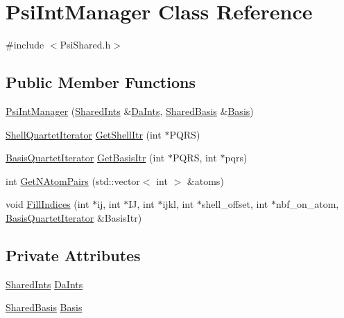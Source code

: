 \hypertarget{classJKBuilder_1_1PsiIntManager}{
\section{PsiIntManager Class Reference}
\label{classJKBuilder_1_1PsiIntManager}
}


{\ttfamily \#include $<$PsiShared.h$>$}\subsection*{Public Member Functions}
\begin{DoxyCompactItemize}
\item 
\hyperlink{classJKBuilder_1_1PsiIntManager_a889963032b8696d99b4b6f17b2b0ea79}{PsiIntManager} (\hyperlink{namespaceJKBuilder_a5f21cc1a0cc795f1cb9aceca0400dcd0}{SharedInts} \&\hyperlink{classJKBuilder_1_1PsiIntManager_abff505bf91f526e978bc6abbf3e0cfc5}{DaInts}, \hyperlink{namespaceJKBuilder_aa50d645c83645be7de5fa94937abf1f3}{SharedBasis} \&\hyperlink{classJKBuilder_1_1PsiIntManager_a1328ec05e99c755f29d64d7ea56fee7e}{Basis})
\item 
\hyperlink{classJKBuilder_1_1ShellQuartetIterator}{ShellQuartetIterator} \hyperlink{classJKBuilder_1_1PsiIntManager_a705edceb221f8e4caf7ddece3fb564a7}{GetShellItr} (int $\ast$PQRS)
\item 
\hyperlink{classJKBuilder_1_1BasisQuartetIterator}{BasisQuartetIterator} \hyperlink{classJKBuilder_1_1PsiIntManager_a5933bbf29c242bc4ca6bf84fa4114948}{GetBasisItr} (int $\ast$PQRS, int $\ast$pqrs)
\item 
int \hyperlink{classJKBuilder_1_1PsiIntManager_a62c0b160046fddcf57ebcdaba797d50b}{GetNAtomPairs} (std::vector$<$ int $>$ \&atoms)
\item 
void \hyperlink{classJKBuilder_1_1PsiIntManager_a8599805b4cb7661e4e0878c6117d71b8}{FillIndices} (int $\ast$ij, int $\ast$IJ, int $\ast$ijkl, int $\ast$shell\_\-offset, int $\ast$nbf\_\-on\_\-atom, \hyperlink{classJKBuilder_1_1BasisQuartetIterator}{BasisQuartetIterator} \&BasisItr)
\end{DoxyCompactItemize}
\subsection*{Private Attributes}
\begin{DoxyCompactItemize}
\item 
\hyperlink{namespaceJKBuilder_a5f21cc1a0cc795f1cb9aceca0400dcd0}{SharedInts} \hyperlink{classJKBuilder_1_1PsiIntManager_abff505bf91f526e978bc6abbf3e0cfc5}{DaInts}
\item 
\hyperlink{namespaceJKBuilder_aa50d645c83645be7de5fa94937abf1f3}{SharedBasis} \hyperlink{classJKBuilder_1_1PsiIntManager_a1328ec05e99c755f29d64d7ea56fee7e}{Basis}
\end{DoxyCompactItemize}


